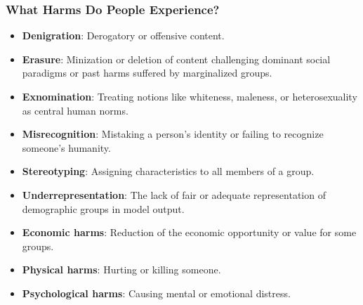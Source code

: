 \documentclass[11pt,aspectratio=169,hyperref={colorlinks}]{beamer}
\begin{document}
		\begin{frame}[t, allowframebreaks]				

			\frametitle{What Harms Do People Experience?}

			\begin{itemize} \small
				\item \textbf{Denigration}: Derogatory or offensive content.
				\item \textbf{Erasure}: Minization or deletion of content challenging dominant social paradigms or past harms suffered by marginalized groups.
				\item \textbf{Exnomination}: Treating notions like whiteness, maleness, or heterosexuality as central human norms.
				\item \textbf{Misrecognition}: Mistaking a person’s identity or failing to recognize someone’s humanity.
				\item \textbf{Stereotyping}: Assigning characteristics to all members of a group.
				\item \textbf{Underrepresentation}: The lack of fair or adequate representation of demographic groups in model output.
				\item \textbf{Economic harms}: Reduction of the economic opportunity or value for some groups.
				\item \textbf{Physical harms}: Hurting or killing someone.  
				\item \textbf{Psychological harms}: Causing mental or emotional distress.

			\end{itemize}
		\end{frame}

			
			
			
			
\end{document}
